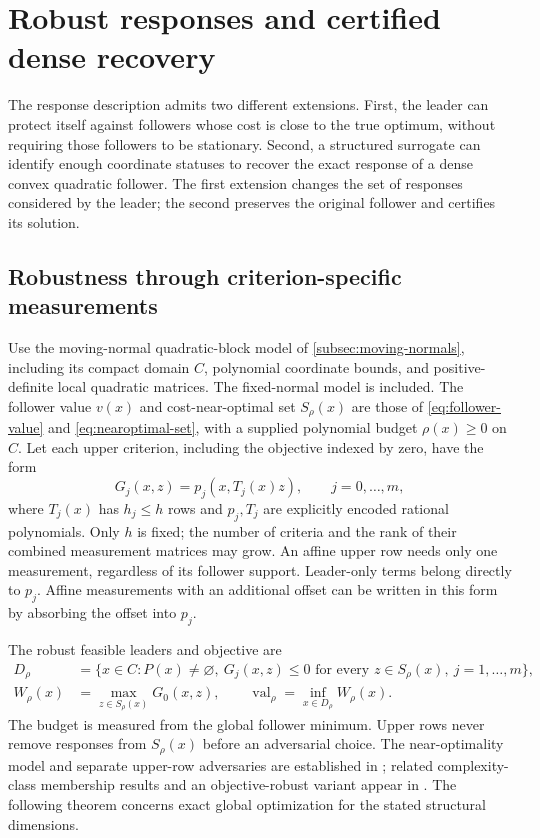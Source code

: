 \section{Robust responses and certified dense recovery}\label{sec:robust-screening}

The response description admits two different extensions. First, the
leader can protect itself against followers whose cost is close to the
true optimum, without requiring those followers to be stationary.
Second, a structured surrogate can identify enough coordinate statuses
to recover the exact response of a dense convex quadratic follower.
The first extension changes the set of responses considered by the leader;
the second preserves the original follower and certifies its solution.

\subsection{Robustness through criterion-specific measurements}\label{subsec:robust-model}

Use the moving-normal quadratic-block model of
\cref{subsec:moving-normals}, including its compact domain $C$,
polynomial coordinate bounds, and positive-definite local quadratic
matrices. The fixed-normal model is included. The follower value $v(x)$
and cost-near-optimal set $S_\rho(x)$ are those of
\eqref{eq:follower-value} and \eqref{eq:nearoptimal-set}, with a supplied polynomial
budget $\rho(x)\ge0$ on $C$. Let each upper criterion, including the
objective indexed by zero, have the form
\begin{equation}\label{eq:measured-criterion}
 G_j(x,z)=p_j(x,T_j(x)z),\qquad j=0,\ldots,m,
\end{equation}
where $T_j(x)$ has $h_j\le h$ rows and $p_j,T_j$ are explicitly encoded
rational polynomials. Only $h$ is fixed; the number of criteria and the
rank of their combined measurement matrices may grow. An affine upper
row needs only one measurement, regardless of its follower support.
Leader-only terms belong directly to $p_j$. Affine measurements with an
additional offset can be written in this form by absorbing the offset
into $p_j$.

The robust feasible leaders and objective are
\begin{align}
 D_\rho&=\{x\in C:P(x)\ne\varnothing,\
      G_j(x,z)\le0\text{ for every }z\in S_\rho(x),\ j=1,\ldots,m\},
 \label{eq:robust-domain}\\
 W_\rho(x)&=\max_{z\in S_\rho(x)}G_0(x,z),\qquad
                    \operatorname{val}_\rho=\inf_{x\in D_\rho}W_\rho(x).
 \label{eq:robust-objective}
\end{align}
The budget is measured from the global follower minimum. Upper rows
never remove responses from $S_\rho(x)$ before an adversarial choice.
The near-optimality model and separate upper-row adversaries are established
in \cite{BesanconAnjosBrotcorne2024}; related complexity-class membership
results and an objective-robust variant appear in
\cite{BesanconAnjosBrotcorne2021}. The following theorem
concerns exact global optimization for the stated structural dimensions.

